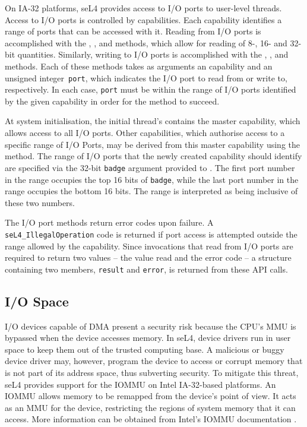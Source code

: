 On IA-32 platforms, seL4 provides access to I/O ports to user-level threads.
Access to I/O ports is controlled by  capabilities. Each
 capability identifies a range of ports that can be accessed with
it. Reading from I/O ports is accomplished with the
,
, and
 methods, which
allow for reading of 8-, 16- and 32-bit quantities.
Similarly, writing to I/O ports is accomplished with the
,
, and
 methods.
Each of these methods takes as arguments an  capability
and an unsigned integer~\texttt{port}, which indicates the I/O port to read from
or write to, respectively.
In each case, \texttt{port} must be within the range of I/O ports identified
by the given  capability in order for the method to succeed.

At system initialisation, the initial thread's  contains the
master  capability, which allows access to all I/O ports.
Other  capabilities, which authorise access to a specific
range of I/O Ports, may be derived from this master capability using
the  method. 
The range of I/O ports that the newly created capability should identify
are specified via the 32-bit \texttt{badge} argument provided to 
. The first port number in the range
occupies the top 16 bits of \texttt{badge}, while the last port number in
the range occupies the bottom 16 bits. The range is interpreted as being
inclusive of these two numbers.

The I/O port methods return error codes upon failure.
A \texttt{seL4\_IllegalOperation} code is returned if port access is
attempted outside the range allowed by the  capability. 
Since invocations that
read from I/O ports are required to return two values -- the value read
and the error code -- a structure containing two members, \texttt{result}
and \texttt{error}, is returned from these API calls.

\subsection{I/O Space}
\label{sec:iospace}

I/O devices capable of DMA present a security risk because the CPU's MMU
is bypassed when the device accesses memory. In seL4, device drivers run
in user space to keep them out of the trusted computing base.
A malicious or buggy device driver may, however, program the device to
access or corrupt memory that is not part of its address space, thus
subverting security. To mitigate this threat, seL4 provides support for
the IOMMU on Intel IA-32-based platforms. An IOMMU allows memory to be
remapped from the device's point of view. It acts as an MMU for the
device, restricting the regions of system memory that it can access.
More information can be obtained from Intel's IOMMU documentation \cite{extra:vtd}.

